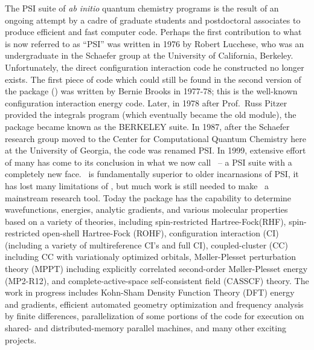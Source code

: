 %
%
%

The PSI suite of {\em ab initio} quantum chemistry programs is the result
of an ongoing attempt by a cadre of graduate students and postdoctoral
associates to produce efficient and fast computer code.  Perhaps the first
contribution to what is now referred to as ``PSI'' was written in 1976 by
Robert Lucchese, who was an undergraduate in the Schaefer group at the
University of California, Berkeley. Unfortunately, the direct configuration
interaction code he constructed no longer exists.  The first piece of code
which could still be found in the second version of the package (\PSItwo)
was written by Bernie Brooks in 1977-78; this is the well-known 
 configuration interaction energy code.
Later, in 1978 after Prof.~Russ Pitzer provided the integrals
program (which eventually became the old  module), the
package became known as the BERKELEY suite.  In 1987, after the Schaefer
research group moved to the Center for Computational Quantum Chemistry here
at the University of Georgia, the code was renamed PSI. In 1999, 
extensive effort of many has come to its conclusion in what we now call
\PSIthree\ -- a PSI suite with a completely new face. \PSIthree\ is fundamentally
superior to older incarnasions of PSI, it has lost many limitations of \PSItwo,
but much work is still needed to make \PSIthree\ a mainstream research tool.
Today the package has the capability to determine wavefunctions, energies, analytic
gradients, and various molecular properties based on a variety of theories,
including spin-restricted Hartree-Fock(RHF), spin-restricted open-shell
Hartree-Fock (ROHF), configuration interaction (CI) (including a variety of
multireference CI's and full CI), coupled-cluster (CC) including CC with
variationaly optimized orbitals, M{\o}ller-Plesset
perturbation theory (MPPT) including explicitly correlated second-order
M{\o}ller-Plesset energy (MP2-R12), and complete-active-space self-consistent field
(CASSCF) theory. The work in progress includes Kohn-Sham Density Function Theory (DFT)
energy and gradients, efficient automated geometry
optimization and frequency analysis by finite differences, parallelization of
some portions of the code for execution on shared- and distributed-memory
parallel machines, and many other exciting projects.
